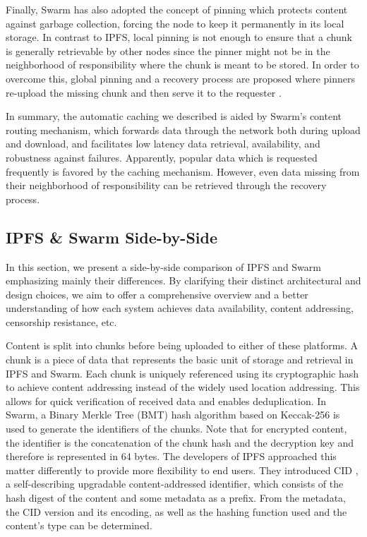 Finally, Swarm has also adopted the concept of pinning which protects content against garbage collection, forcing the node to keep it permanently in its local storage. In contrast to IPFS, local pinning is not enough to ensure that a chunk is generally retrievable by other nodes since the pinner might not be in the neighborhood of responsibility where the chunk is meant to be stored. In order to overcome this, global pinning and a recovery process are proposed where pinners re-upload the missing chunk and then serve it to the requester \citep[pp.~161--167]{tron_2020}.

In summary, the automatic caching we described is aided by Swarm's content routing mechanism, which forwards data through the network both during upload and download, and facilitates low latency data retrieval, availability, and robustness against failures. Apparently, popular data which is requested frequently is favored by the caching mechanism. However, even data missing from their neighborhood of responsibility can be retrieved through the recovery process.

\subsection{IPFS \& Swarm Side-by-Side}\label{sec:ipfs_vs_swarm}
In this section, we present a side-by-side comparison of IPFS and Swarm emphasizing mainly their differences. By clarifying their distinct architectural and design choices, we aim to offer a comprehensive overview and a better understanding of how each system achieves data availability, content addressing, censorship resistance, etc.

Content is split into chunks before being uploaded to either of these platforms. A chunk is a piece of data that represents the basic unit of storage and retrieval in IPFS and Swarm. Each chunk is uniquely referenced using its cryptographic hash to achieve content addressing instead of the widely used location addressing. This allows for quick verification of received data and enables deduplication. In Swarm, a Binary Merkle Tree (BMT)  \citep{tron_2020} hash algorithm based on Keccak-256 is used to generate the identifiers of the chunks. Note that for encrypted content, the identifier is the concatenation of the chunk hash and the decryption key and therefore is represented in 64 bytes. The developers of IPFS approached this matter differently to provide more flexibility to end users. They introduced CID  \citep{multiformat}, a self-describing upgradable content-addressed identifier, which consists of the hash digest of the content and some metadata as a prefix. From the metadata, the CID version and its encoding, as well as the hashing function used and the content’s type can be determined.

